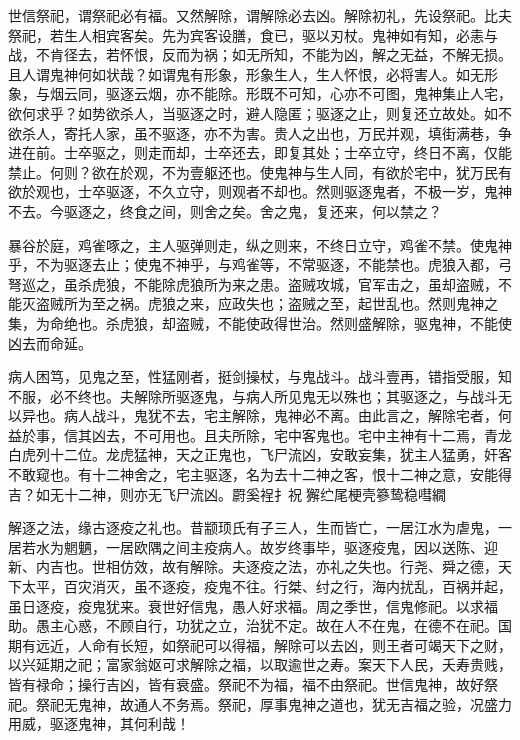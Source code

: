 \documentclass[]{article}
\begin{document}
世信祭祀，谓祭祀必有福。又然解除，谓解除必去凶。解除初礼，先设祭祀。比夫祭祀，若生人相宾客矣。先为宾客设膳，食已，驱以刃杖。鬼神如有知，必恚与战，不肯径去，若怀恨，反而为祸；如无所知，不能为凶，解之无益，不解无损。且人谓鬼神何如状哉？如谓鬼有形象，形象生人，生人怀恨，必将害人。如无形象，与烟云同，驱逐云烟，亦不能除。形既不可知，心亦不可图，鬼神集止人宅，欲何求乎？如势欲杀人，当驱逐之时，避人隐匿；驱逐之止，则复还立故处。如不欲杀人，寄托人家，虽不驱逐，亦不为害。贵人之出也，万民并观，填街满巷，争进在前。士卒驱之，则走而却，士卒还去，即复其处；士卒立守，终日不离，仅能禁止。何则？欲在於观，不为壹躯还也。使鬼神与生人同，有欲於宅中，犹万民有欲於观也，士卒驱逐，不久立守，则观者不却也。然则驱逐鬼者，不极一岁，鬼神不去。今驱逐之，终食之间，则舍之矣。舍之鬼，复还来，何以禁之？

暴谷於庭，鸡雀啄之，主人驱弹则走，纵之则来，不终日立守，鸡雀不禁。使鬼神乎，不为驱逐去止；使鬼不神乎，与鸡雀等，不常驱逐，不能禁也。虎狼入都，弓弩巡之，虽杀虎狼，不能除虎狼所为来之患。盗贼攻城，官军击之，虽却盗贼，不能灭盗贼所为至之祸。虎狼之来，应政失也；盗贼之至，起世乱也。然则鬼神之集，为命绝也。杀虎狼，却盗贼，不能使政得世治。然则盛解除，驱鬼神，不能使凶去而命延。

病人困笃，见鬼之至，性猛刚者，挺剑操杖，与鬼战斗。战斗壹再，错指受服，知不服，必不终也。夫解除所驱逐鬼，与病人所见鬼无以殊也；其驱逐之，与战斗无以异也。病人战斗，鬼犹不去，宅主解除，鬼神必不离。由此言之，解除宅者，何益於事，信其凶去，不可用也。且夫所除，宅中客鬼也。宅中主神有十二焉，青龙白虎列十二位。龙虎猛神，天之正鬼也，飞尸流凶，安敢妄集，犹主人猛勇，奸客不敢窥也。有十二神舍之，宅主驱逐，名为去十二神之客，恨十二神之意，安能得吉？如无十二神，则亦无飞尸流凶。罻奚裎扌祝獬纻尾梗壳篸鸷稳嘒繝

解逐之法，缘古逐疫之礼也。昔颛顼氏有子三人，生而皆亡，一居江水为虐鬼，一居若水为魍魉，一居欧隅之间主疫病人。故岁终事毕，驱逐疫鬼，因以送陈、迎新、内吉也。世相仿效，故有解除。夫逐疫之法，亦礼之失也。行尧、舜之德，天下太平，百灾消灭，虽不逐疫，疫鬼不往。行桀、纣之行，海内扰乱，百祸并起，虽日逐疫，疫鬼犹来。衰世好信鬼，愚人好求福。周之季世，信鬼修祀。以求福助。愚主心惑，不顾自行，功犹之立，治犹不定。故在人不在鬼，在德不在祀。国期有远近，人命有长短，如祭祀可以得福，解除可以去凶，则王者可竭天下之财，以兴延期之祀；富家翁妪可求解除之福，以取逾世之寿。案天下人民，夭寿贵贱，皆有禄命；操行吉凶，皆有衰盛。祭祀不为福，福不由祭祀。世信鬼神，故好祭祀。祭祀无鬼神，故通人不务焉。祭祀，厚事鬼神之道也，犹无吉福之验，况盛力用威，驱逐鬼神，其何利哉！
\end{document}
